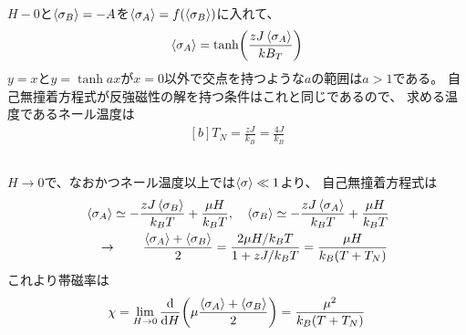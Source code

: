 \documentclass[../../sp_2016.tex]{subfiles}
\begin{document}
\subsection{}
\(H-0\)と\(\ev{\sigma_B}=-A\)を\(\ev{\sigma_A}=f(\ev{\sigma_B})\)に入れて、
\begin{equation}\begin{aligned}[b]
    \ev{\sigma_A} = \tanh(\frac{zJ\ev{\sigma_A}}{kB_T})
\end{aligned}\end{equation}
\(y=x\)と\(y=\tanh ax\)が\(x=0\)以外で交点を持つような\(a\)の範囲は\(a>1\)である。
自己無撞着方程式が反強磁性の解を持つ条件はこれと同じであるので、
求める温度であるネール温度は
\begin{equation}\begin{aligned}[b]
    T_N = \frac{zJ}{k_B} = \frac{4J}{k_B}
\end{aligned}\end{equation}

\subsection{}
\(H\to 0\)で、なおかつネール温度以上では\(\ev{\sigma}\ll 1\)より、
自己無撞着方程式は
\begin{equation}\begin{aligned}[b]
    &\ev{\sigma_A} \simeq -\frac{zJ\ev{\sigma_B}}{k_BT}+\frac{\mu H}{k_BT},\quad
    \ev{\sigma_B} \simeq -\frac{zJ\ev{\sigma_A}}{k_BT}+\frac{\mu H}{k_BT}\\
    &\quad\rightarrow\qquad \frac{\ev{\sigma_A}+\ev{\sigma_B}}{2} = \frac{2\mu H/k_BT}{1+zJ/k_BT} = \frac{\mu H}{k_B(T+T_N)}
\end{aligned}\end{equation}
これより帯磁率は
\begin{equation}\begin{aligned}[b]
    \chi = \lim_{H\to0} \dv{H}\qty(\mu\frac{\ev{\sigma_A}+\ev{\sigma_B}}{2}) = \frac{\mu^2}{k_B(T+T_N)}
\end{aligned}\end{equation}
\end{document}
